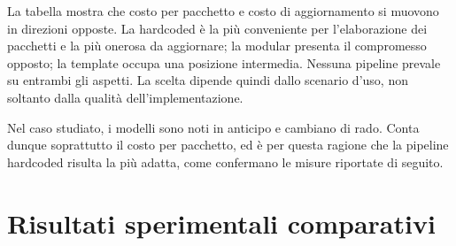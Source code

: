 \documentclass[binding=0.6cm,italian,oneside,noexaminfo]{sapthesis}
\begin{document}
\begin{table}[h]
\centering
\caption{Le tre pipeline lungo gli assi che le distinguono. Da P1 a P3 la flessibilità cresce, e con essa il costo per pacchetto; specularmente cala il costo di aggiornamento del modello.}
\label{tab:confronto}
\setlength{\tabcolsep}{4pt}
\renewcommand{\arraystretch}{1.15}
\end{table}

La tabella mostra che costo per pacchetto e costo di aggiornamento si muovono in direzioni opposte. La hardcoded è la più conveniente per l'elaborazione dei pacchetti e la più onerosa da aggiornare; la modular presenta il compromesso opposto; la template occupa una posizione intermedia. Nessuna pipeline prevale su entrambi gli aspetti. La scelta dipende quindi dallo scenario d'uso, non soltanto dalla qualità dell'implementazione.

Nel caso studiato, i modelli sono noti in anticipo e cambiano di rado. Conta dunque soprattutto il costo per pacchetto, ed è per questa ragione che la pipeline hardcoded risulta la più adatta, come confermano le misure riportate di seguito.

\section{Risultati sperimentali comparativi}
\label{sec:results}
\end{document}
